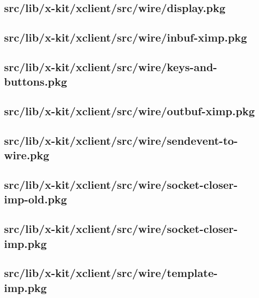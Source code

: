\subsection{src/lib/x-kit/xclient/src/wire/display.pkg}


\subsection{src/lib/x-kit/xclient/src/wire/inbuf-ximp.pkg}


\subsection{src/lib/x-kit/xclient/src/wire/keys-and-buttons.pkg}


\subsection{src/lib/x-kit/xclient/src/wire/outbuf-ximp.pkg}


\subsection{src/lib/x-kit/xclient/src/wire/sendevent-to-wire.pkg}


\subsection{src/lib/x-kit/xclient/src/wire/socket-closer-imp-old.pkg}


\subsection{src/lib/x-kit/xclient/src/wire/socket-closer-imp.pkg}


\subsection{src/lib/x-kit/xclient/src/wire/template-imp.pkg}


